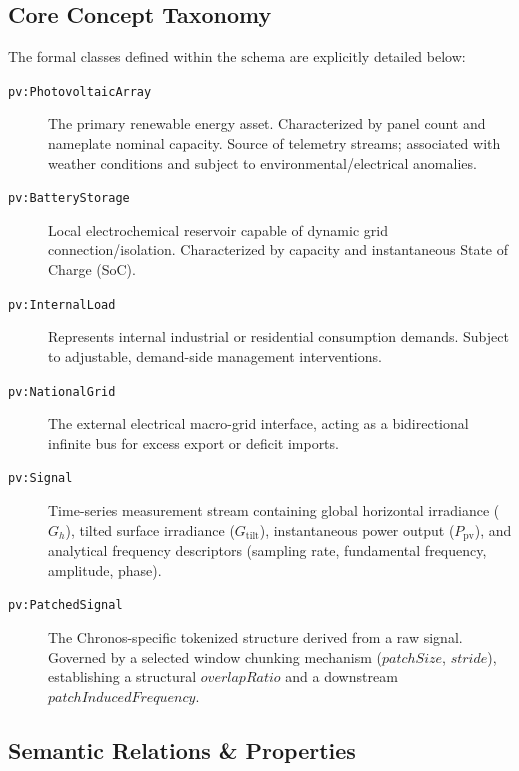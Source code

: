 \subsection{Core Concept Taxonomy}
The formal classes defined within the schema are explicitly detailed below:
\begin{description}
    \item[\texttt{pv:PhotovoltaicArray}] The primary renewable energy asset. Characterized by panel count and nameplate nominal capacity. Source of telemetry streams; associated with weather conditions and subject to environmental/electrical anomalies.
    \item[\texttt{pv:BatteryStorage}] Local electrochemical reservoir capable of dynamic grid connection/isolation. Characterized by capacity and instantaneous State of Charge (SoC).
    \item[\texttt{pv:InternalLoad}] Represents internal industrial or residential consumption demands. Subject to adjustable, demand-side management interventions.
    \item[\texttt{pv:NationalGrid}] The external electrical macro-grid interface, acting as a bidirectional infinite bus for excess export or deficit imports.
    \item[\texttt{pv:Signal}] Time-series measurement stream containing global horizontal irradiance ($G_h$), tilted surface irradiance ($G_{\text{tilt}}$), instantaneous power output ($P_{\text{pv}}$), and analytical frequency descriptors (sampling rate, fundamental frequency, amplitude, phase).
    \item[\texttt{pv:PatchedSignal}] The Chronos-specific tokenized structure derived from a raw signal. Governed by a selected window chunking mechanism ($patchSize$, $stride$), establishing a structural $overlapRatio$ and a downstream $patchInducedFrequency$.
\end{description}

\subsection{Semantic Relations \& Properties}

